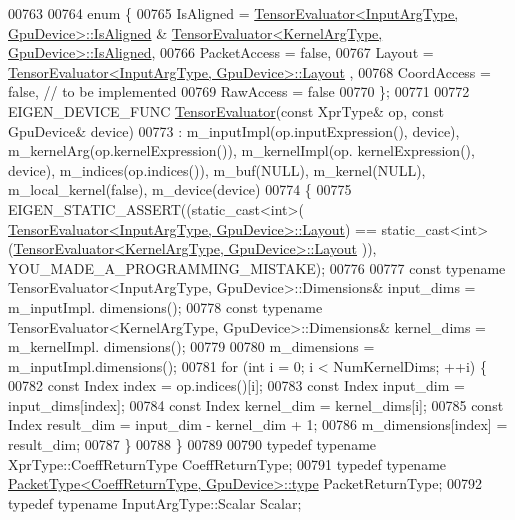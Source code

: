 \begin{DoxyCode}
00763 
00764   \textcolor{keyword}{enum} \{
00765     IsAligned = \hyperlink{struct_eigen_1_1_tensor_evaluator}{TensorEvaluator<InputArgType, GpuDevice>::IsAligned}
       & \hyperlink{struct_eigen_1_1_tensor_evaluator}{TensorEvaluator<KernelArgType, GpuDevice>::IsAligned},
00766     PacketAccess = \textcolor{keyword}{false},
00767     Layout = \hyperlink{struct_eigen_1_1_tensor_evaluator}{TensorEvaluator<InputArgType, GpuDevice>::Layout}
      ,
00768     CoordAccess = \textcolor{keyword}{false},  \textcolor{comment}{// to be implemented}
00769     RawAccess = \textcolor{keyword}{false}
00770   \};
00771 
00772   EIGEN\_DEVICE\_FUNC \hyperlink{struct_eigen_1_1_tensor_evaluator}{TensorEvaluator}(\textcolor{keyword}{const} XprType& op, \textcolor{keyword}{const} GpuDevice& device)
00773       : m\_inputImpl(op.inputExpression(), device), m\_kernelArg(op.kernelExpression()), m\_kernelImpl(op.
      kernelExpression(), device), m\_indices(op.indices()), m\_buf(NULL), m\_kernel(NULL), m\_local\_kernel(\textcolor{keyword}{false}), 
      m\_device(device)
00774   \{
00775     EIGEN\_STATIC\_ASSERT((static\_cast<int>(
      \hyperlink{struct_eigen_1_1_tensor_evaluator}{TensorEvaluator<InputArgType, GpuDevice>::Layout}) == 
      static\_cast<int>(\hyperlink{struct_eigen_1_1_tensor_evaluator}{TensorEvaluator<KernelArgType, GpuDevice>::Layout}
      )), YOU\_MADE\_A\_PROGRAMMING\_MISTAKE);
00776 
00777     \textcolor{keyword}{const} \textcolor{keyword}{typename} TensorEvaluator<InputArgType, GpuDevice>::Dimensions& input\_dims = m\_inputImpl.
      dimensions();
00778     \textcolor{keyword}{const} \textcolor{keyword}{typename} TensorEvaluator<KernelArgType, GpuDevice>::Dimensions& kernel\_dims = m\_kernelImpl.
      dimensions();
00779 
00780     m\_dimensions = m\_inputImpl.dimensions();
00781     \textcolor{keywordflow}{for} (\textcolor{keywordtype}{int} i = 0; i < NumKernelDims; ++i) \{
00782       \textcolor{keyword}{const} Index index = op.indices()[i];
00783       \textcolor{keyword}{const} Index input\_dim = input\_dims[index];
00784       \textcolor{keyword}{const} Index kernel\_dim = kernel\_dims[i];
00785       \textcolor{keyword}{const} Index result\_dim = input\_dim - kernel\_dim + 1;
00786       m\_dimensions[index] = result\_dim;
00787     \}
00788   \}
00789 
00790   \textcolor{keyword}{typedef} \textcolor{keyword}{typename} XprType::CoeffReturnType CoeffReturnType;
00791   \textcolor{keyword}{typedef} \textcolor{keyword}{typename} \hyperlink{group___sparse_core___module}{PacketType<CoeffReturnType, GpuDevice>::type}
       PacketReturnType;
00792   \textcolor{keyword}{typedef} \textcolor{keyword}{typename} InputArgType::Scalar Scalar;

\end{DoxyCode}
